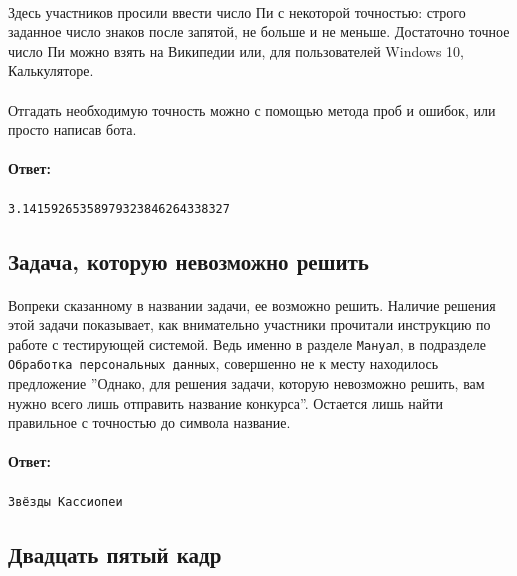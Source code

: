 \documentclass[12pt]{article}
\begin{document}
	\paragraph{}
    Здесь участников просили ввести число Пи с некоторой точностью:
	строго заданное число знаков после запятой, не больше и не меньше.
	Достаточно точное число Пи можно взять на Википедии или, для пользователей Windows 10, Калькуляторе.
    \paragraph{}
    Отгадать необходимую точность можно с помощью метода проб и ошибок, или просто написав бота.
    \paragraph{Ответ:}
    \verb|3.14159265358979323846264338327|

    \subsection{Задача, которую невозможно решить}
	\paragraph{}
    Вопреки сказанному в названии задачи, ее возможно решить.
	Наличие решения этой задачи показывает,
	как внимательно участники прочитали инструкцию по работе с тестирующей системой.
	Ведь именно в разделе \verb|Мануал|, в подразделе \verb|Обработка персональных данных|,
	совершенно не к месту находилось предложение
    ''Однако, для решения задачи, которую невозможно решить, вам нужно всего лишь отправить название конкурса''.
	Остается лишь найти правильное с точностью до символа название.
    \paragraph{Ответ:}
    \verb|Звёзды Кассиопеи|

    \subsection{Двадцать пятый кадр}
\end{document}
